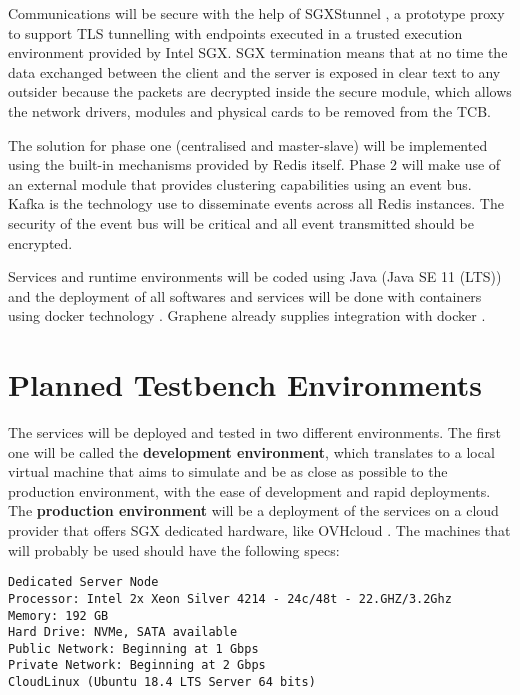Communications will be secure with the help of SGXStunnel \cite{sgxstunnel:1}, a prototype proxy to support TLS tunnelling with endpoints executed in a trusted execution environment provided by Intel SGX. \gls{SGX} termination means that at no time the data exchanged between the client and the server is exposed in clear text to any outsider because the packets are decrypted inside the secure module, which allows the network drivers, modules and physical cards to be removed from the \gls{TCB}.

The solution for phase one (centralised and master-slave) will be implemented using the built-in mechanisms provided by Redis itself. Phase 2 will make use of an external module that provides clustering capabilities using an event bus. Kafka \cite{kafka:1} is the technology use to disseminate events across all Redis instances. The security of the event bus will be critical and all event transmitted should be encrypted.

Services and runtime environments will be coded using Java (Java SE 11 (LTS)) and the deployment of all softwares and services will be done with containers using docker technology \cite{docker:1}. Graphene already supplies integration with docker \cite{graphene_container:1}.

\section{Planned Testbench Environments} %
\label{sec:planned_testbench_environments}

The services will be deployed and tested in two different environments. The first one will be called the \textbf{development environment}, which translates to a local virtual machine that aims to simulate and be as close as possible to the production environment, with the ease of development and rapid deployments. The \textbf{production environment} will be a deployment of the services on a cloud provider that offers \gls{SGX} dedicated hardware, like OVHcloud \cite{ovhcloud:1}. The machines that will probably be used should have the following specs:

\lstset{numbers=none, caption=Machine Specifications, label=lst:machine_specs}
\begin{lstlisting}
Dedicated Server Node
Processor: Intel 2x Xeon Silver 4214 - 24c/48t - 22.GHZ/3.2Ghz
Memory: 192 GB
Hard Drive: NVMe, SATA available
Public Network: Beginning at 1 Gbps
Private Network: Beginning at 2 Gbps
CloudLinux (Ubuntu 18.4 LTS Server 64 bits)
\end{lstlisting}

